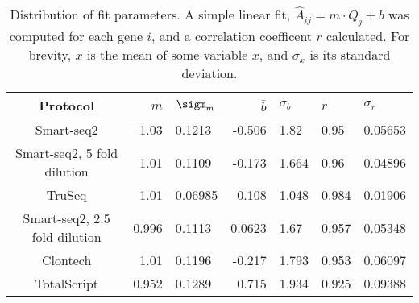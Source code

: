 
\begin{table}[htdp]

\caption{Distribution of fit parameters. A simple linear fit,
             $\hat{A}_{ij} = m \cdot Q_{j} + b$
             was computed for each gene $i$, and a correlation coefficent $r$
             calculated.  For brevity,
             $\bar{x}$ is the mean of some variable $x$, and $\sigma_x$ is its
             standard deviation.  }
\begin{center}
\begin{tabular}{|c|r@{$\pm$}l|r@{$\pm$}l|}
 \hline Protocol & $\bar{m}$ & $\sigm_m$ & $\bar{b}$ & $\sigma_b$ & $\bar{r}$ & $\sigma_r$ \\\hline
Smart-seq2 & 1.03 & 0.1213 & -0.506 & 1.82 & 0.95 & 0.05653 \\
Smart-seq2, 5 fold dilution & 1.01 & 0.1109 & -0.173 & 1.664 & 0.96 & 0.04896 \\
TruSeq & 1.01 & 0.06985 & -0.108 & 1.048 & 0.984 & 0.01906 \\
Smart-seq2, 2.5 fold dilution & 0.996 & 0.1113 & 0.0623 & 1.67 & 0.957 & 0.05348 \\
Clontech & 1.01 & 0.1196 & -0.217 & 1.793 & 0.953 & 0.06097 \\
TotalScript & 0.952 & 0.1289 & 0.715 & 1.934 & 0.925 & 0.09388 \\
\hline
\end{tabular}
\label{tab:fits}
\end{center}
\end{table}



              